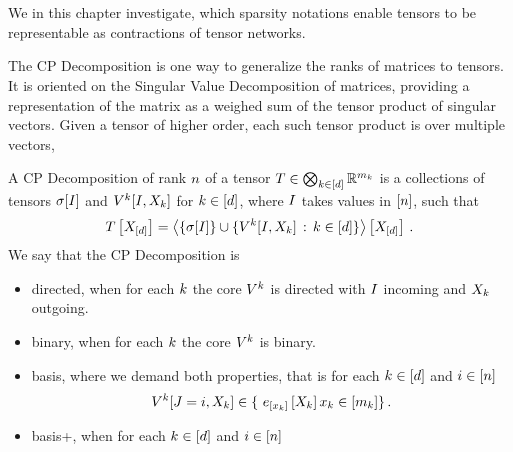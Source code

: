 \chapter{\chatextsparseCalculus}\label{cha:sparseCalculus}

We in this chapter investigate, which sparsity notations enable tensors to be representable as contractions of tensor networks.



The CP Decomposition is one way to generalize the ranks of matrices to tensors.
It is oriented on the Singular Value Decomposition of matrices, providing a representation of the matrix as a weighed sum of the tensor product of singular vectors.
Given a tensor of higher order, each such tensor product is over multiple vectors, 

\begin{definition}\label{def:cpFormats}
	A CP Decomposition of rank $n$ of a tensor $T\in\bigotimes_{k\in[d]} \mathbb{R}^{m_{k}}$ is a collections of tensors $\sigma[I]$ and $V^{k}[I,X_{k}]$ for $k\in[d]$, where $I$ takes values in $[n]$, such that
		\[  T\left[X_{[d]}\right]
		= \left\langle 
		\{\sigma[I]\} \cup \{ V^{k}[I,X_{k}] \, : \, k\in[d] \}
		\right\rangle \left[ X_{[d]} \right] \, . 
		\]
	We say that the CP Decomposition is
	\begin{itemize}
		\item directed, when for each $k$ the core $V^{k}$ is directed with $I$ incoming and $X_{k}$ outgoing.
		\item binary, when for each $k$ the core $V^{k}$ is binary.
		\item basis, where we demand both properties, that is for each $k\in[d]$ and $i\in[n]$ 
			\[ \legcoreofat{\atomenumerator}{\inddecvar,\catvariableof{\atomenumerator}}\in \{ \onehotmapofat{[\catindexof{\atomenumerator}]}{\catvariableof{\atomenumerator}} \catindexof{\atomenumerator}\in[\catdimof{\atomenumerator}] \}\, . \]
		\item basis+, when for each $k\in[d]$ and $i\in[n]$  %

\end{itemize}
\end{definition}

